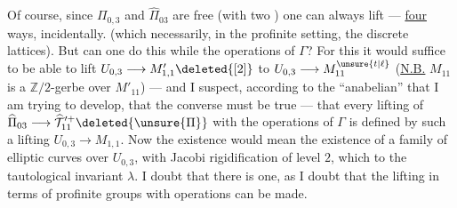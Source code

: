 
Of course, since $\Pi_{0,3}$ and $\widehat\Pi_{03}$ are free (with two ) one can always lift ---  \uline{four} ways, incidentally. (which necessarily, in the profinite setting,  the discrete lattices). But can one do this while  the operations of $\Gamma$? For this it would suffice to be able to lift $U_{0,3}\longrightarrow M'_{1,1}\deleted{[2]}$ to $U_{0,3}\longrightarrow M_{11}^{\unsure{t|\ell}}$ (\uline{N.B.} $M_{11}$ is a  $\mathbb Z/2$-gerbe over $M'_{11}$) --- and I suspect, 
according to the ``anabelian''  that I am trying to develop, that the converse must be true --- that every lifting of $\widehat\Pi_{03}\longrightarrow\widehat{\mathcal T}_{11}^{\prime+}\deleted{\unsure{\Pi}}$  with the operations of $\Gamma$ is defined by such a lifting $U_{0,3}\longrightarrow M_{1,1}$. Now the existence  would mean  the existence of a family of elliptic curves over $U_{0,3}$, with
Jacobi rigidification of level $2$, which  to the tautological invariant $\lambda$. I doubt that there is one, as I doubt that the lifting in terms of profinite groups with operations can be made.

